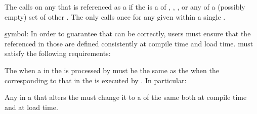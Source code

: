The  calls  on any 
that is referenced as a  if the  is a
 of ,
, , or any of a 
(possibly empty)  set of other .
The  only calls  once for
any given  within a single .

 \item{}\b{symbol:} In order to guarantee that  can be 
  correctly, users must ensure that the  referenced in those 
  are defined consistently at compile time and load time.  
  must satisfy the following requirements:
  
\beginlist
{} The  when a  in the 
      is processed by  must be the same as the 
      when the  corresponding to that  in the
       is executed by .  In particular:

\beginlist

 Any  in a  that alters
	  the  must change it to a 
	  of the same  both at compile time and at load time.

